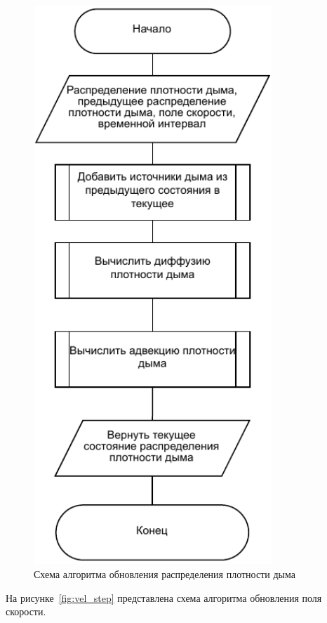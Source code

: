 \begin{figure}[H]
	\centering
	\includegraphics[width=0.8\textwidth, page=1]{assets/img/dens_step.pdf}   
	\caption{Схема алгоритма обновления распределения плотности дыма}
	\label{fig:dens_step}
\end{figure}

На рисунке~\ref{fig:vel_step} представлена схема алгоритма обновления поля скорости.

